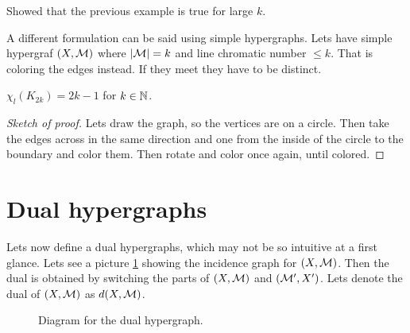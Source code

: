 \begin{thm}
	Showed that the previous example is true for large $k$.
\end{thm}

A different formulation can be said using simple hypergraphs. Lets have simple hypergraf $(X,\mathcal{M})$ where $|\mathcal{M}| = k$ and line chromatic number $\leq k$. That is coloring the edges instead. If they meet they have to be distinct.

\begin{prop}
	$\chi_l (K_{2k}) = 2k-1$ for $k \in \mathbb{N}$.
\end{prop}

\begin{proof}[Sketch of proof]
	Lets draw the graph, so the vertices are on a circle. Then take the edges across in the same direction and one from the inside of the circle to the boundary and color them. Then rotate and color once again, until colored.
\end{proof}

\section{Dual hypergraphs}

Lets now define a dual hypergraphs, which may not be so intuitive at a first glance. Lets see a picture \ref{dual-hg} showing the incidence graph for $(X,\mathcal{M})$. Then the dual is obtained by switching the parts of $(X, \mathcal{M})$ and $(\mathcal{M}',X')$. Lets denote the dual of $(X,\mathcal{M})$ as $d(X,\mathcal{M})$.

\begin{figure}[!ht]\centering
	\begin{subfigure}{.45\textwidth}
	\end{subfigure}
	\begin{subfigure}{.45\textwidth}
	\end{subfigure}
	\caption{Diagram for the dual hypergraph.}
	\label{dual-hg}
\end{figure}

